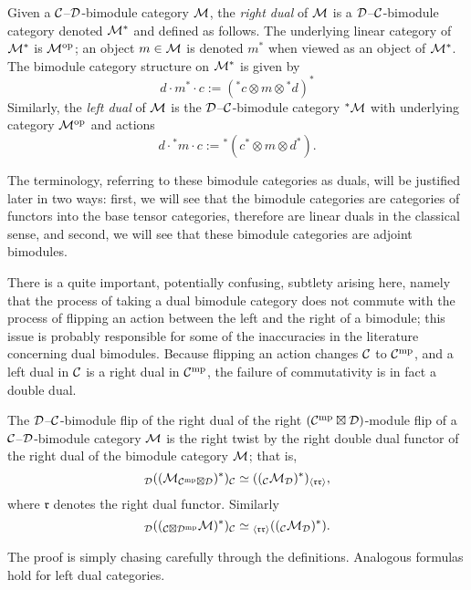 \documentclass{amsart}
\begin{document}
\begin{definition} \label{def:Dual_bimodule_notation}
Given a $\mathcal C$--$\mathcal D$-bimodule category $\mathcal M$, the \emph{right dual} of $\mathcal M$ is a $\mathcal D$--$\mathcal C$-bimodule category denoted $\mathcal M^*$ and defined as follows.  The underlying linear category of $\mathcal M^*$ is $\mathcal M^{\mathrm{op}}$; an object $m \in \mathcal M$ is denoted $m^*$ when viewed as an object of $\mathcal M^*$.  The bimodule category structure on $\mathcal M^*$ is given by
\[
d \cdot m^* \cdot c := ({}^* c \otimes m \otimes {}^* d)^*
\]
Similarly, the \emph{left dual} of $\mathcal M$ is the $\mathcal D$--$\mathcal C$-bimodule category ${}^* \mathcal M$ with underlying category $\mathcal M^{\mathrm{op}}$ and actions
\[
d \cdot {}^* m \cdot c := {}^* (c^* \otimes m \otimes d^*).
\]
\end{definition}

\noindent The terminology, referring to these bimodule categories as duals, will be justified later in two ways: first, we will see that the bimodule categories are categories of functors into the base tensor categories, therefore are linear duals in the classical sense, and second, we will see that these bimodule categories are adjoint bimodules.  

There is a quite important, potentially confusing, subtlety arising here, namely that the process of taking a dual bimodule category does not commute with the process of flipping an action between the left and the right of a bimodule; this issue is probably responsible for some of the inaccuracies in the literature concerning dual bimodules.  Because flipping an action changes $\mathcal C$ to $\mathcal C^{\mathrm{mp}}$, and a left dual in $\mathcal C$ is a right dual in $\mathcal C^{\mathrm{mp}}$, the failure of commutativity is in fact a double dual.
\begin{lemma} \label{lemma:DualTwist}
The $\mathcal D$--$\mathcal C$-bimodule flip of the right dual of the right $(\mathcal C^{\mathrm{mp}} \boxtimes \mathcal D)$-module flip of a $\mathcal C$--$\mathcal D$-bimodule category $\mathcal M$ is the right twist by the right double dual functor of the right dual of the bimodule category $\mathcal M$; that is,
\[
{}_\mathcal D ((\mathcal M_{\mathcal C^{\mathrm{mp}} \boxtimes \mathcal D})^*)_\mathcal C \simeq (({}_\mathcal C \mathcal M_\mathcal D)^*)_{\langle \mathfrak{r r} \rangle},
\]
where $\mathfrak{r}$ denotes the right dual functor.  Similarly
\[
{}_\mathcal D (({}_{\mathcal C \boxtimes \mathcal D^{\mathrm{mp}}}\mathcal M)^*)_\mathcal C \simeq {}_{\langle \mathfrak{r r} \rangle}(({}_\mathcal C \mathcal M_\mathcal D)^*).
\]

\end{lemma}
\noindent The proof is simply chasing carefully through the definitions.  Analogous formulas hold for left dual categories.
\end{document}
